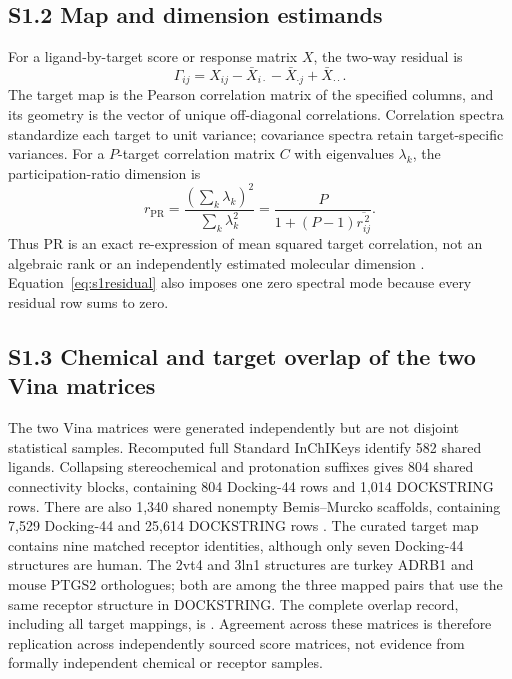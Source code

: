 \documentclass[11pt]{article}
\begin{document}
\subsection*{S1.2 Map and dimension estimands}

For a ligand-by-target score or response matrix $X$, the two-way residual is
\begin{equation}
\Gamma_{ij}=X_{ij}-\bar X_{i\cdot}-\bar X_{\cdot j}+\bar X_{\cdot\cdot}.
\label{eq:s1residual}
\end{equation}
The target map is the Pearson correlation matrix of the specified columns, and
its geometry is the vector of unique off-diagonal correlations. Correlation
spectra standardize each target to unit variance; covariance spectra retain
target-specific variances. For a $P$-target correlation matrix $C$ with
eigenvalues $\lambda_k$, the participation-ratio dimension is
\begin{equation}
r_{\mathrm{PR}}
=\frac{(\sum_k\lambda_k)^2}{\sum_k\lambda_k^2}
=\frac{P}{1+(P-1)\overline{r_{ij}^{\,2}}}.
\label{eq:s1pr}
\end{equation}
Thus PR is an exact re-expression of mean squared target correlation, not an
algebraic rank or an independently estimated molecular dimension
\cite{mazzucato2016,roy2007}. Equation~\ref{eq:s1residual} also imposes one zero
spectral mode because every residual row sums to zero.

\subsection*{S1.3 Chemical and target overlap of the two Vina matrices}

The two Vina matrices were generated independently but are not disjoint
statistical samples. Recomputed full Standard InChIKeys identify 582 shared
ligands. Collapsing stereochemical and protonation suffixes gives 804 shared
connectivity blocks, containing 804 Docking-44 rows and 1,014 DOCKSTRING rows.
There are also 1,340 shared nonempty Bemis--Murcko scaffolds, containing 7,529
Docking-44 and 25,614 DOCKSTRING rows \cite{murcko1996}. The curated target map
contains nine matched receptor identities, although only seven Docking-44
structures are human. The 2vt4 and 3ln1 structures are turkey ADRB1 and mouse
PTGS2 orthologues; both are among the three mapped pairs that use the same
receptor structure in DOCKSTRING. The complete overlap record, including all
target mappings, is
. Agreement across these
matrices is therefore replication across independently sourced score matrices,
not evidence from formally independent chemical or receptor samples.
\end{document}
